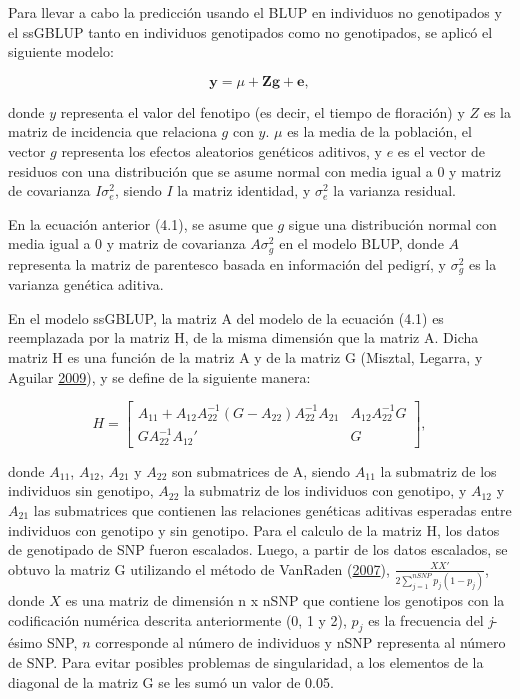 \documentclass[11pt,spanish,a4paper,oneside,]{book} %
\begin{document}
Para llevar a cabo la predicción usando el BLUP en individuos no genotipados y el ssGBLUP tanto en individuos genotipados como no genotipados, se aplicó el siguiente modelo:

\begin{equation}
\textbf{y} = \mu + \textbf{Z} \textbf{g} + \textbf{e},
\end{equation}

donde \(y\) representa el valor del fenotipo (es decir, el tiempo de floración) y \(Z\) es la matriz de incidencia que relaciona \(g\) con \(y\). \(\mu\) es la media de la población, el vector \(g\) representa los efectos aleatorios genéticos aditivos, y \(e\) es el vector de residuos con una distribución que se asume normal con media igual a \(0\) y matriz de covarianza \(I\sigma^{2}_{e}\), siendo \(I\) la matriz identidad, y \(\sigma_{e}^{2}\) la varianza residual.

En la ecuación anterior (4.1), se asume que \(g\) sigue una distribución normal con media igual a \(0\) y matriz de covarianza \(A\sigma^{2}_{g}\) en el modelo BLUP, donde \(A\) representa la matriz de parentesco basada en información del pedigrí, y \(\sigma^{2}_{g}\) es la varianza genética aditiva.

En el modelo ssGBLUP, la matriz A del modelo de la ecuación (4.1) es reemplazada por la matriz H, de la misma dimensión que la matriz A. Dicha matriz H es una función de la matriz A y de la matriz G (Misztal, Legarra, y Aguilar \protect\hyperlink{ref-cite:16}{2009}), y se define de la siguiente manera:

\begin{equation}
H =
\begin{bmatrix}
A_{11} + A_{12} A_{22}^{-1} ( G - A_{22} ) A_{22}^{-1}  A_{21} & A_{12} A_{22}^{-1} G \\ 
G A_{22}^{-1} A_{12}' & G 
\end{bmatrix}
,
\end{equation}

donde \(A_{11}\), \(A_{12}\), \(A_{21}\) y \(A_{22}\) son submatrices de A, siendo \(A_{11}\) la submatriz de los individuos sin genotipo, \(A_{22}\) la submatriz de los individuos con genotipo, y \(A_{12}\) y \(A_{21}\) las submatrices que contienen las relaciones genéticas aditivas esperadas entre individuos con genotipo y sin genotipo. Para el calculo de la matriz H, los datos de genotipado de SNP fueron escalados. Luego, a partir de los datos escalados, se obtuvo la matriz G utilizando el método de VanRaden (\protect\hyperlink{ref-cite:39}{2007}), \(\frac{XX'}{2 \sum_{j=1}^{nSNP} p_{j} (1 - p_{j})}\), donde \(X\) es una matriz de dimensión n x nSNP que contiene los genotipos con la codificación numérica descrita anteriormente (0, 1 y 2), \(p_{j}\) es la frecuencia del \emph{j}-ésimo SNP, \(n\) corresponde al número de individuos y nSNP representa al número de SNP. Para evitar posibles problemas de singularidad, a los elementos de la diagonal de la matriz G se les sumó un valor de 0.05.
\end{document}
